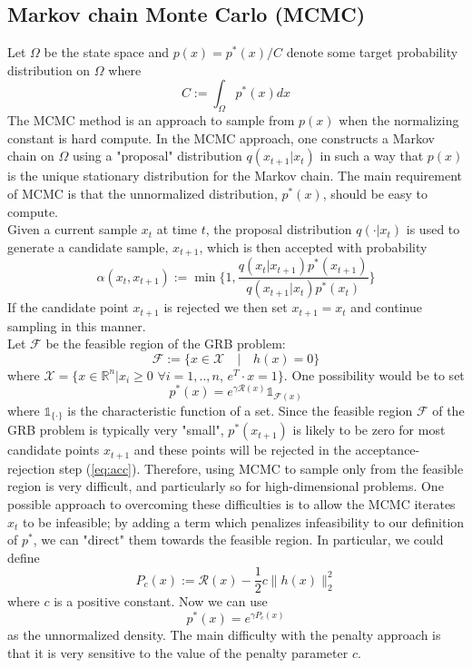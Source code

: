 {\subsection{Markov chain Monte Carlo (MCMC)}
Let $\Omega$ be the state space and $p(x) = p^*(x)/C$ denote some target probability distribution on $\Omega$ where 
\begin{equation}
C := \int_{\Omega} p^*(x) dx
\end{equation}
The MCMC method is an approach to sample from $p(x)$ when the normalizing constant is hard compute. In the MCMC approach, one
constructs a Markov chain on $\Omega$ using a "proposal" distribution $q(x_{t+1}|x_t)$ in such a way that $p(x)$
is the unique stationary distribution for the Markov chain. The main requirement of MCMC is that the unnormalized distribution, $p^*(x)$, should be easy to compute. \\
Given a current sample $x_t$ at time $t$, the proposal distribution $q(\cdot | x_t)$ is used to generate
a candidate sample, $x_{t+1}$, which is then accepted with probability
\begin{equation}\label{eq:acc}
\alpha(x_t, x_{t+1}) := \min \Big\{ 1, \frac{q(x_t|x_{t+1})p^*(x_{t+1})}{q(x_{t+1}|x_t)p^*(x_t)}\Big\}
\end{equation}
If the candidate point $x_{t+1}$ is rejected we then set $x_{t+1} = x_t$ and continue sampling in this manner.\\
Let $\mathcal{F}$ be the feasible region of the GRB problem:
\begin{equation}
\mathcal{F} := \{ x \in \mathcal{X}\quad|\quad h(x) = 0\}
\end{equation}
where $\mathcal{X} = \{x \in \mathbb{R}^n | x_i \geq 0$ $\forall i=1,..,n$, $e^T\cdot x = 1\}$. One possibility would be to set
\begin{equation}
p^*(x) = e^{\gamma \mathcal{R}(x)}\mathds{1}_{\mathcal{F}(x)} 
\end{equation}
where $\mathds{1}_{\{\cdot\}}$ is the characteristic function of a set. Since the feasible region $\mathcal{F}$ of the GRB problem is typically very "small", $p^*(x_{t+1})$ is likely to be zero for most candidate points $x_{t+1}$ and these points will be rejected in the acceptance-rejection step (\ref{eq:acc}). Therefore, using MCMC to sample only from the feasible region is very difficult, and particularly so for high-dimensional problems. One possible approach to overcoming these difficulties is to allow the MCMC iterates $x_t$ to be infeasible; by adding a term which penalizes infeasibility to our definition of $p^*$, we can "direct" them towards the feasible region. In particular, we could define
\begin{equation}
P_c(x) := \mathcal{R}(x) - \frac{1}{2} c \parallel h(x) \parallel^2_2
\end{equation}
where $c$ is a positive constant. Now we can use
\begin{equation}
p^*(x) = e^{\gamma P_c(x)}
\end{equation}
as the unnormalized density. The main difficulty with the penalty approach is that it is very sensitive to the value of the penalty parameter $c$.

}
